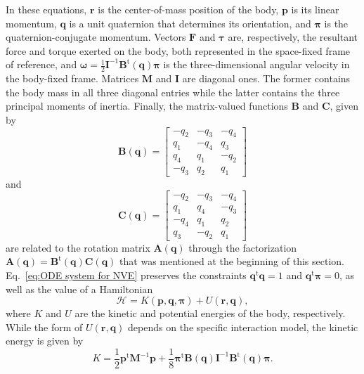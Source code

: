 \documentclass[
	aip,
	jcp,
	reprint,
]{revtex4-1}
\newcommand{\mt}[1]{\boldsymbol{\mathbf{#1}}}          %
\newcommand{\vt}[1]{\boldsymbol{\mathbf{#1}}}          %
\newcommand{\tr}[1]{#1^\text{t}}                       %
\newcommand{\Ham}[1]{{\mathcal H}_\text{#1}}           %
\begin{document}
In these equations, $\vt r$ is the center-of-mass position of the body, $\vt p$ is its linear momentum, $\vt q$ is a unit quaternion that determines its orientation, and $\vt \pi$ is the quaternion-conjugate momentum.
Vectors $\vt F$ and $\vt \tau$ are, respectively, the resultant force and torque exerted on the body, both represented in the space-fixed frame of reference, and $\vt \omega = \frac{1}{2} {\mt I}^{-1} \tr{\mt B}(\vt q) {\vt \pi}$ is the three-dimensional angular velocity in the body-fixed frame.
Matrices $\mt M$ and $\mt I$ are diagonal ones.
The former contains the body mass in all three diagonal entries while the latter contains the three principal moments of inertia.
Finally, the matrix-valued functions $\mt B$ and $\vt C$, given by
\begin{equation*}
\label{eq:def_B_and_C}
\mt B(\vt q) = \left[\begin{array}{rrrr}
-q_2 & -q_3 & -q_4 \\
 q_1 & -q_4 &  q_3 \\
 q_4 &  q_1 & -q_2 \\
-q_3 &  q_2 &  q_1
\end{array}\right]
\end{equation*}
and
\begin{equation*}
\mt C(\vt q) = \left[\begin{array}{rrrr}
-q_2 & -q_3 & -q_4 \\
 q_1 &  q_4 & -q_3 \\
-q_4 &  q_1 &  q_2 \\
 q_3 & -q_2 &  q_1
\end{array}\right]
\end{equation*}
are related to the rotation matrix ${\mt A}(\vt q)$ through the factorization ${\mt A}(\vt q) = \tr{\mt B}(\vt q) {\mt C}(\vt q)$ that was mentioned at the beginning of this section. Eq.~\eqref{eq:ODE system for NVE} preserves the constraints $\tr{\vt q}{\vt q} = 1$ and $\tr{\vt q}{\vt \pi} = 0$, as well as the value of a Hamiltonian
\begin{equation}
\label{eq:Hamiltonian}
\Ham{} = K(\vt p, \vt q, \vt \pi) + U(\vt r,\vt q),
\end{equation}
where $K$ and $U$ are the kinetic and potential energies of the body, respectively.
While the form of $U(\vt r, \vt q)$ depends on the specific interaction model, the kinetic energy is given by
\begin{equation}
\label{eq:kinetic energy}
K = \frac{1}{2} \tr{\vt p} {\mt M}^{-1} {\vt p} + \frac{1}{8} \tr{\vt \pi} {\mt B}(\vt q) {\mt I}^{-1} \tr{\mt B}(\vt q) {\vt \pi}.
\end{equation}
\end{document}
